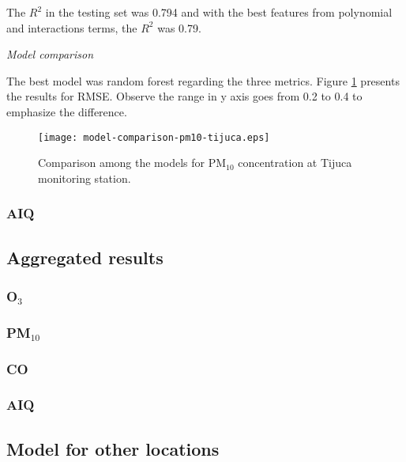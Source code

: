 \vspace{2mm}

The $R^2$ in the testing set was 0.794 and with the best features from
polynomial and interactions terms, the $R^2$ was 0.79.

{\em Model comparison} 

\vspace{2mm}

The best model was random forest regarding the three metrics. Figure
\ref{fig:model-comparison-pm10-tijuca} presents the results for RMSE. Observe
the range in y axis goes from 0.2 to 0.4 to emphasize the difference.

\begin{figure}
    \centering
    \texttt{[image: model-comparison-pm10-tijuca.eps]}
    \caption{Comparison among the models for PM$_{10}$ concentration at Tijuca monitoring station.}
    \label{fig:model-comparison-pm10-tijuca}
\end{figure}

\subsubsection{AIQ}

\subsection{Aggregated results}

\subsubsection{O\texorpdfstring{$_3$}{3}}

\subsubsection{PM\texorpdfstring{$_{10}$}{10}}

\subsubsection{CO}

\subsubsection{AIQ}

\subsection{Model for other locations}

